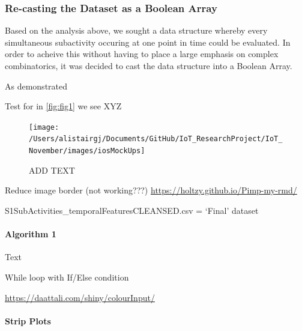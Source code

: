 \documentclass[11pt,]{article}
\let\oldparagraph\paragraph
\renewcommand{\paragraph}[1]{\oldparagraph{#1}\mbox{}}
\begin{document}
\hypertarget{re-casting-the-dataset-as-a-boolean-array}{%
\subsubsection{Re-casting the Dataset as a Boolean
Array}\label{re-casting-the-dataset-as-a-boolean-array}}

Based on the analysis above, we sought a data structure whereby every
simultaneous subactivity occuring at one point in time could be
evaluated. In order to acheive this without having to place a large
emphasis on complex combinatorics, it was decided to cast the data
structure into a Boolean Array.

As demonstrated

Test for in \ref{fig:fig1} we see XYZ

\begin{figure}[H]

{\centering \texttt{[image: /Users/alistairgj/Documents/GitHub/IoT\_ResearchProject/IoT\_November/images/iosMockUps]} 

}

\caption{ADD TEXT}\label{fig:unnamed-chunk-12}
\end{figure}

\pagebreak

Reduce image border (not working???)
\url{https://holtzy.github.io/Pimp-my-rmd/}

S1SubActivities\_temporalFeaturesCLEANSED.csv = `Final' dataset

\hypertarget{algorithm-1}{%
\paragraph{Algorithm 1}\label{algorithm-1}}

Text

\begin{algorithm}[H]
\DontPrintSemicolon
\SetAlgoLined
{}
\BlankLine
{}
\caption{While loop with If/Else condition}
\end{algorithm}

\url{https://daattali.com/shiny/colourInput/}

\hypertarget{strip-plots}{%
\paragraph{Strip Plots}\label{strip-plots}}
\end{document}
